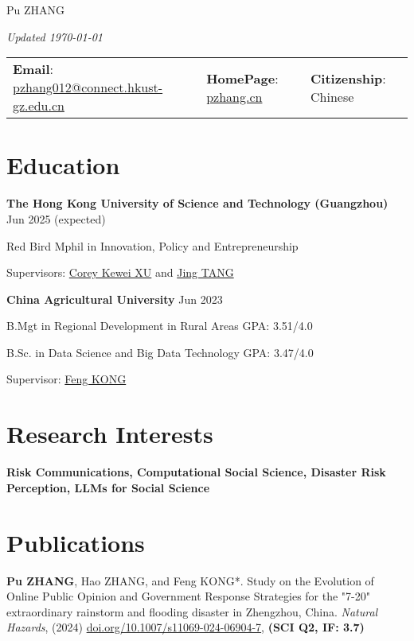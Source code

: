 \documentclass[letterpaper, 11pt]{article}
\begin{document}
\setlength{\parindent}{0pt}
\begin{center}
    \Huge Pu ZHANG
\end{center}
\hfill{\it\footnotesize Updated \today}

\vspace{0cm} 
\begin{center}
\begin{tabular}{lll}
\textbf{Email}: \href{mailto:pzhang012@connect.hkust-gz.edu.cn}{pzhang012@connect.hkust-gz.edu.cn} &
\hspace{0.1in} \textbf{HomePage}: \href{https://pzhang.cn}{pzhang.cn} &
\hspace{0.1in} \textbf{Citizenship}: Chinese 
\end{tabular}
\end{center}

\section{Education}
\textbf{{The Hong Kong University of Science and Technology (Guangzhou)}} \hfill Jun 2025 (expected)

{Red Bird Mphil} in {Innovation, Policy and Entrepreneurship}

Supervisors: \href{https://facultyprofiles.hkust-gz.edu.cn/faculty-personal-page/XU-Kewei/coreyxu}{Corey Kewei XU} and \href{https://facultyprofiles.hkust-gz.edu.cn/faculty-personal-page/TANG-Jing/jingtang}{Jing TANG} 

\vspace{0.5em}
\textbf{{China Agricultural University}} \hfill Jun 2023

B.Mgt in Regional Development in Rural Areas \hfill{ GPA: 3.51/4.0}

B.Sc. in Data Science and Big Data Technology \hfill{ GPA: 3.47/4.0}

Supervisor: \href{https://cohd.cau.edu.cn/art/2020/11/27/art_48059_998984.html}{Feng KONG} 

\section{Research Interests}
\textbf{Risk Communications, Computational Social Science, Disaster Risk Perception, LLMs for Social Science}

\section{Publications}
\textbf{Pu ZHANG}, Hao ZHANG, and Feng KONG*. Study on the Evolution of Online Public Opinion and Government Response Strategies for the "7-20" extraordinary rainstorm and flooding disaster in Zhengzhou, China. \textit{Natural Hazards}, (2024) \href{https://doi.org/10.1007/s11069-024-06904-7}{doi.org/10.1007/s11069-024-06904-7}, \textbf{(SCI Q2, IF: 3.7)}
\end{document}
